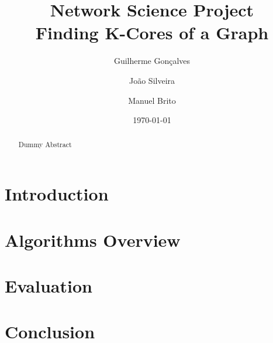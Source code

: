 \documentclass[a4paper, 11pt]{article}
\title{Network Science Project \\ \textbf{Finding K-Cores of a Graph}}
\author{Guilherme Gonçalves \and João Silveira \and Manuel Brito}
\date{\today}
\begin{document}
\maketitle


\begin{abstract}
Dummy Abstract
\clearpage
\end{abstract}

\clearpage
\tableofcontents
\clearpage

\section{Introduction}


\section{Algorithms Overview}


\section{Evaluation}


\section{Conclusion}



% 
\end{document}
